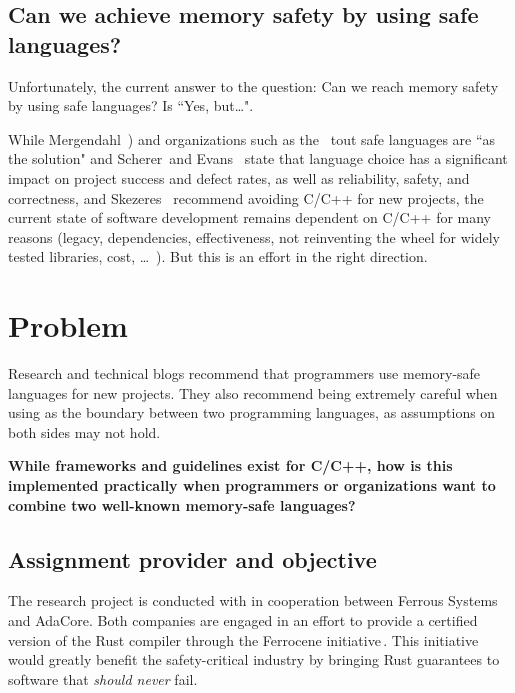 \documentclass[nomenclature, english, bibtex]{kththesis}
\newcommand*{\sweExpl}[1]{\todo[inline, backgroundcolor=kth-lightblue40]{#1}}  %
\begin{document}
\subsection{Can we achieve memory safety by using safe languages?}
\label{sec:CanMemorySafety}

Unfortunately, the current answer to the question: Can we reach memory safety by using safe languages? Is ``Yes, but\ldots".

While Mergendahl \etal\,\cite{mergendahl_cross-language_2022}) and organizations such as the \,\cite{noauthor_nsa_2022} tout safe languages are ``as the solution" and Scherer\,\cite{scherer_engineering_2021} and Evans \etal\,\cite{evans_is_2020} state that language choice has a significant impact on project success and defect rates, as well as reliability, safety, and correctness,  and Skezeres \etal\,\cite{szekeres_sok_2013} recommend avoiding C/C++ for new projects, the current state of software development remains dependent on C/C++ for many reasons (legacy, dependencies, effectiveness, not reinventing the wheel for widely tested libraries, cost, \ldots\  ). But this is an effort in the right direction.


\section{Problem}
\label{sec:problem}

Research and technical blogs recommend that programmers use memory-safe languages for new projects. They also recommend being extremely careful when using  as the boundary between two programming languages, as assumptions on both sides may not hold. 

\textbf{While frameworks and guidelines exist for C/C++, how is this implemented practically when programmers or organizations want to combine two well-known memory-safe languages?}

\subsection{Assignment provider and objective}

The research project is conducted with in cooperation between Ferrous Systems and AdaCore. Both companies are engaged in an effort to provide a certified version of the Rust compiler through the Ferrocene initiative\,\cite{noauthor_ferrocene_2023}. This initiative would greatly benefit the \gls{safety-critical} industry by bringing Rust guarantees to software that \emph{should never} fail.
\end{document}
